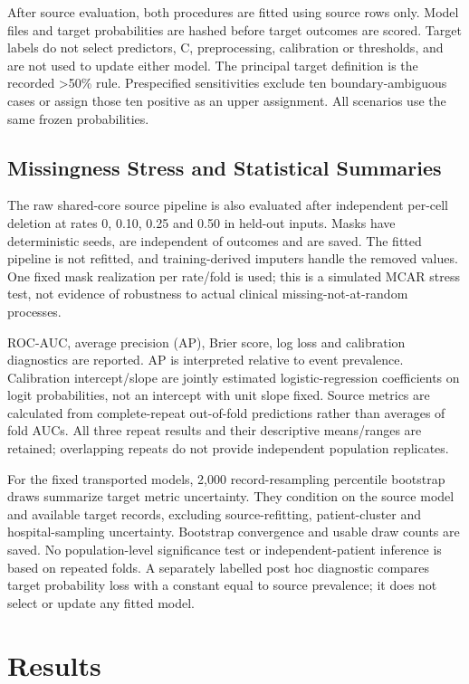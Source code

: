 \documentclass[conference]{IEEEtran}
\begin{document}
After source evaluation, both procedures are fitted using source rows only. Model files and target probabilities are hashed before target outcomes are scored. Target labels do not select predictors, C, preprocessing, calibration or thresholds, and are not used to update either model. The principal target definition is the recorded >50\% rule. Prespecified sensitivities exclude ten boundary-ambiguous cases or assign those ten positive as an upper assignment. All scenarios use the same frozen probabilities.

\subsection{Missingness Stress and Statistical Summaries}
The raw shared-core source pipeline is also evaluated after independent per-cell deletion at rates 0, 0.10, 0.25 and 0.50 in held-out inputs. Masks have deterministic seeds, are independent of outcomes and are saved. The fitted pipeline is not refitted, and training-derived imputers handle the removed values. One fixed mask realization per rate/fold is used; this is a simulated MCAR stress test, not evidence of robustness to actual clinical missing-not-at-random processes.

ROC-AUC, average precision (AP), Brier score, log loss and calibration diagnostics are reported. AP is interpreted relative to event prevalence. Calibration intercept/slope are jointly estimated logistic-regression coefficients on logit probabilities, not an intercept with unit slope fixed. Source metrics are calculated from complete-repeat out-of-fold predictions rather than averages of fold AUCs. All three repeat results and their descriptive means/ranges are retained; overlapping repeats do not provide independent population replicates.

For the fixed transported models, 2,000 record-resampling percentile bootstrap draws summarize target metric uncertainty. They condition on the source model and available target records, excluding source-refitting, patient-cluster and hospital-sampling uncertainty. Bootstrap convergence and usable draw counts are saved. No population-level significance test or independent-patient inference is based on repeated folds. A separately labelled post hoc diagnostic compares target probability loss with a constant equal to source prevalence; it does not select or update any fitted model.

\section{Results}
\end{document}
